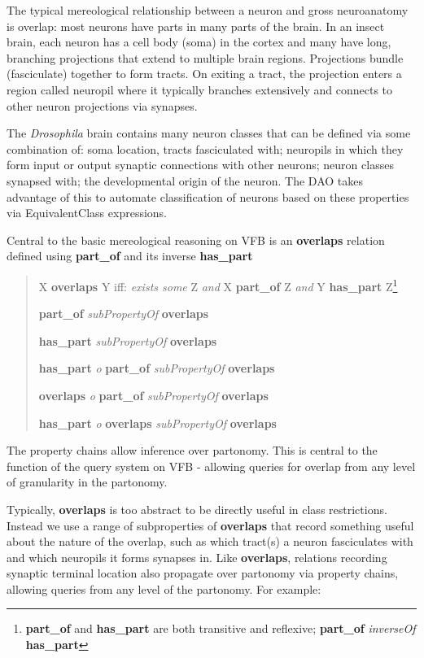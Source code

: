 \documentclass[runningheads,a4paper]{llncs}
\begin{document}
The typical mereological relationship between a neuron and gross
neuroanatomy is overlap:  most neurons have parts in many
parts of the brain.  In an insect brain, each neuron has a cell body
(soma) in the cortex and many have long, branching projections that extend
to multiple brain regions.  Projections bundle (fasciculate)
together to form tracts.  On exiting a tract, the projection enters a
region called neuropil where it typically branches extensively and
connects to other neuron projections via synapses.

The \textit{Drosophila} brain contains many neuron classes that can be
defined via some combination of: soma location, tracts fasciculated
with; neuropils in which they form input or output synaptic
connections with other neurons; neuron classes synapsed with; the
developmental origin of the neuron.  The DAO takes advantage of this
to automate classification of neurons based on these properties via
EquivalentClass expressions.

Central to the basic mereological reasoning on VFB is an
\textbf{overlaps} relation defined using \textbf{part\_of} and its
inverse \textbf{has\_part}

\begin{quote}
X \textbf{overlaps} Y iff: \textit{exists some} Z \textit{and}
X \textbf{part\_of} Z \textit{and} Y \textbf{has\_part}
Z\footnote{\textbf{part\_of} and \textbf{has\_part} are both
  transitive and reflexive; \textbf{part\_of} \textit{inverseOf}
  \textbf{has\_part}}

\textbf{part\_of} \textit{subPropertyOf}
  \textbf{overlaps}

\textbf{has\_part} \textit{subPropertyOf} \textbf{overlaps}

\textbf{has\_part} \textit{o} \textbf{part\_of} \textit{subPropertyOf}
\textbf{overlaps}

\textbf{overlaps} \textit{o} \textbf{part\_of} \textit{subPropertyOf} \textbf{overlaps}

\textbf{has\_part} \textit{o} \textbf{overlaps} \textit{subPropertyOf}
\textbf{overlaps}\end{quote}

The property chains allow inference over partonomy.  This is central
to the function of the query system on VFB - allowing queries for
overlap from any level of granularity in the partonomy.

Typically, \textbf{overlaps} is too abstract to be directly useful in
class restrictions. Instead we use a range of subproperties of
\textbf{overlaps} that record something useful about the nature of the
overlap, such as which tract(s) a neuron fasciculates with and which
neuropils it forms synapses in.  Like \textbf{overlaps}, relations
recording synaptic terminal location also propagate over partonomy via
property chains, allowing queries from any level of the partonomy.
For example:
\end{document}
